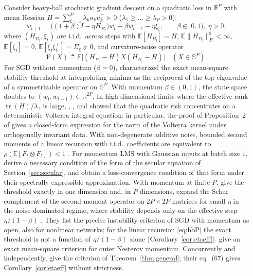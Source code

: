 \documentclass[11pt]{article}
\theoremstyle{remark}
\newcommand{\E}{\mathbb{E}}
\newcommand{\R}{\mathbb{R}}
\newcommand{\tr}{\operatorname{tr}}
\begin{document}
Consider heavy-ball stochastic gradient descent on a quadratic loss in $\R^P$ with mean Hessian $H = \sum_{k=1}^P \lambda_k u_k u_k^\top \succ 0$ ($\lambda_1 \ge \dots \ge \lambda_P > 0$):
\begin{equation}\label{eq:hbP}
w_{t+1} = \big((1+\beta)I - \eta H_{B_t}\big)w_t - \beta w_{t-1} - \eta \xi_t, \qquad \beta \in [0,1),\ \eta > 0,
\end{equation}
where $(H_{B_t}, \xi_t)$ are i.i.d.\ across steps with $\E[H_{B_t}] = H$, $\E\|H_{B_t}\|_F^2 < \infty$, $\E[\xi_t] = 0$, $\E[\xi_t \xi_t^\top] = \Sigma_\xi \succeq 0$, and curvature-noise operator
\[
\mathcal V(X) \triangleq \E\big[(H_{B_t} - H) X (H_{B_t} - H)\big] \quad (X \in \mathbb S^P).
\]
For SGD without momentum ($\beta = 0$), \citet{mulayoff2024exact} characterized the exact mean-square stability threshold at interpolating minima as the reciprocal of the top eigenvalue of a symmetrizable operator on $\mathbb S^P$. With momentum $\beta \in (0,1)$, the state space doubles to $(w_t, w_{t-1}) \in \R^{2P}$. In high-dimensional limits where the effective rank $\tr(H)/\lambda_1$ is large, \citet{paquette2021momentum}, \citet{lee2022minibatch}, and \citet{cheng2024highdim} showed that the quadratic risk concentrates on a deterministic Volterra integral equation; in particular, the proof of Proposition~2 of \citet{lee2022minibatch} gives a closed-form expression for the norm of the Volterra kernel under orthogonally invariant data. With non-degenerate additive noise, bounded second moments of a linear recursion with i.i.d.\ coefficients are equivalent to $\rho(\E[F_t\otimes F_t])<1$ \citep[Chapter~3]{costa2005mjls}. For momentum LMS with Gaussian inputs at batch size $1$, \citet{roy1990momentum} derive a necessary condition of the form of the secular equation of Section~\ref{sec:secular}, and \citet{velikanov2023view} obtain a loss-convergence condition of that form under their spectrally expressible approximation. With momentum at finite $P$, \citet{andreyev2026momentum} give the threshold exactly in one dimension and, in $P$ dimensions, expand the Schur complement of the second-moment operator on $2P \times 2P$ matrices for small $\eta$ in the noise-dominated regime, where stability depends only on the effective step $\eta/(1-\beta)$ \citep[the rescaling of][]{yuan2016momentum}. They list the precise instability criterion of SGD with momentum as open, also for nonlinear networks; for the linear recursion \eqref{eq:hbP} the exact threshold is not a function of $\eta/(1-\beta)$ alone (Corollary~\ref{cor:etaeff}). \citet{sharma2026outer} give an exact mean-square criterion for outer Nesterov momentum. Concurrently and independently, \citet[Theorem~F.1]{cai2026llm} give the criterion of Theorem~\ref{thm:general}; their eq.~(67) gives Corollary~\ref{cor:etaeff} without strictness.
\end{document}
